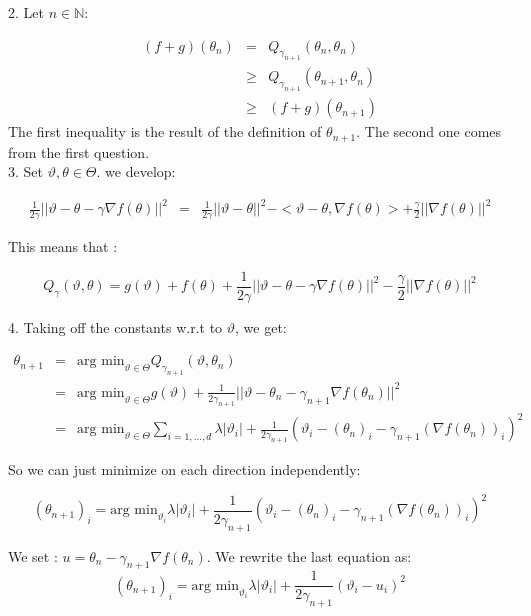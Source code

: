 	2. Let $n \in \mathbb{N}$:
	
	\begin{eqnarray*}
		(f+g)(\theta_{n})&=& Q_{\gamma_{n+1}}(\theta_{n},\theta_{n})\\
								&\geq& Q_{\gamma_{n+1}}(\theta_{n+1},\theta_{n})\\ 
								&\geq& (f+g)(\theta_{n+1})
	\end{eqnarray*}
	The first inequality is the result of the definition of $\theta_{n+1}$. The second one comes from the first question.\\
	
	3. Set $ \vartheta , \theta \in \Theta$. we develop: 
	
	\begin{eqnarray*}
		\frac{1}{2\gamma}\vert\vert \vartheta - \theta -\gamma \nabla f(\theta) \vert\vert^2&=&\frac{1}{2\gamma}\vert\vert \vartheta - \theta \vert \vert ^2 - <\vartheta - \theta ,\nabla f(\theta)>+\frac{\gamma}{2} \vert\vert \nabla f(\theta)\vert\vert^2
	\end{eqnarray*}
	
	This means that :
	
	$$Q_{\gamma}(\vartheta,\theta)= g(\vartheta)+f(\theta)+ 	\frac{1}{2\gamma}\vert\vert \vartheta - \theta -\gamma \nabla f(\theta) \vert\vert^2-\frac{\gamma}{2} \vert\vert \nabla f(\theta)\vert\vert^2$$
	
	4. Taking off the constants w.r.t to $\vartheta$, we get:
	
	\begin{eqnarray*}
		\theta_{n+1}&=& \text{arg min}_{\vartheta \in \Theta} Q_{\gamma_{n+1}} (\vartheta,\theta_n)\\
							&=& \text{arg min}_{\vartheta \in \Theta} g(\vartheta)+\frac{1}{2\gamma_{n+1}}\vert\vert \vartheta - \theta_n -\gamma_{n+1} \nabla f(\theta_n) \vert\vert^2\\
							&=& \text{arg min}_{\vartheta \in \Theta} \sum_{i=1,\dots,d} \lambda \vert \vartheta_i \vert 
							 + \frac{1}{2\gamma_{n+1}}( \vartheta_i -( \theta_n)_i - \gamma_{n+1}( \nabla f(\theta_n))_i )^2
	\end{eqnarray*}
	
	So we can just minimize on each direction independently:
	
	$$(\theta_{n+1})_i= \text{arg min}_{\vartheta_i} \lambda \vert \vartheta_i \vert+ \frac{1}{2\gamma_{n+1}}( \vartheta_i - ( \theta_n)_i -\gamma_{n+1}( \nabla f(\theta_n))_i )^2$$
	
	We set : $u= \theta_n-\gamma_{n+1}\nabla f(\theta_n)$. We rewrite the last equation as:
	$$(\theta_{n+1})_i= \text{arg min}_{\vartheta_i} \lambda \vert \vartheta_i \vert + \frac{1}{2 \gamma_{n+1}}( \vartheta_i - u_i)^2$$
	
